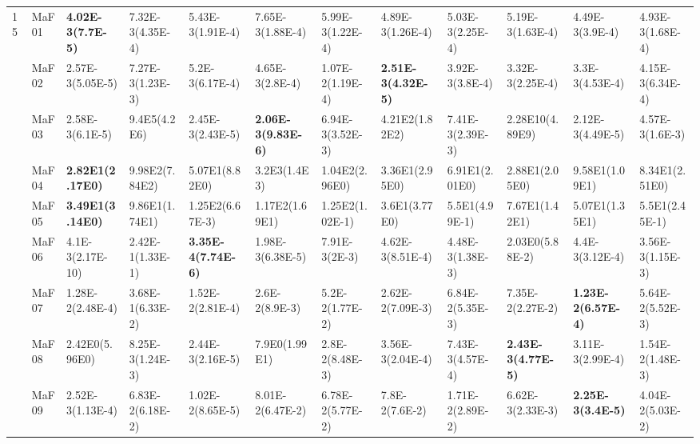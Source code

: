 \documentclass[]{article}
\begin{document}
\begin{landscape}
\begin{table}
\begin{footnotesize}
\begin{tabular}{|l|l|l|l|l|l|l|l|l|l|l|l|}
\multirow{15}{*}{15} & MaF01 & \cellcolor{gray95} {\bf 4.02E-3(7.7E-5)} & 7.32E-3(4.35E-4) & 5.43E-3(1.91E-4) & 7.65E-3(1.88E-4) & 5.99E-3(1.22E-4) & \cellcolor{gray95} 4.89E-3(1.26E-4) & 5.03E-3(2.25E-4) & 5.19E-3(1.63E-4) & \cellcolor{gray95} 4.49E-3(3.9E-4) & \cellcolor{gray95} 4.93E-3(1.68E-4)\\
 & MaF02 & \cellcolor{gray95} 2.57E-3(5.05E-5) & 7.27E-3(1.23E-3) & 5.2E-3(6.17E-4) & 4.65E-3(2.8E-4) & 1.07E-2(1.19E-4) & \cellcolor{gray95} {\bf 2.51E-3(4.32E-5)} & 3.92E-3(3.8E-4) & \cellcolor{gray95} 3.32E-3(2.25E-4) & \cellcolor{gray95} 3.3E-3(4.53E-4) & 4.15E-3(6.34E-4)\\
 & MaF03 & 2.58E-3(6.1E-5) & 9.4E5(4.2E6) & \cellcolor{gray95} 2.45E-3(2.43E-5) & \cellcolor{gray95} {\bf 2.06E-3(9.83E-6)} & 6.94E-3(3.52E-3) & 4.21E2(1.82E2) & 7.41E-3(2.39E-3) & 2.28E10(4.89E9) & \cellcolor{gray95} 2.12E-3(4.49E-5) & 4.57E-3(1.6E-3)\\
 & MaF04 & \cellcolor{gray95} {\bf 2.82E1(2.17E0)} & 9.98E2(7.84E2) & \cellcolor{gray95} 5.07E1(8.82E0) & 3.2E3(1.4E3) & 1.04E2(2.96E0) & \cellcolor{gray95} 3.36E1(2.95E0) & 6.91E1(2.01E0) & \cellcolor{gray95} 2.88E1(2.05E0) & 9.58E1(1.09E1) & 8.34E1(2.51E0)\\
 & MaF05 & \cellcolor{gray95} {\bf 3.49E1(3.14E0)} & 9.86E1(1.74E1) & 1.25E2(6.67E-3) & 1.17E2(1.69E1) & 1.25E2(1.02E-1) & \cellcolor{gray95} 3.6E1(3.77E0) & \cellcolor{gray95} 5.5E1(4.99E-1) & 7.67E1(1.42E1) & \cellcolor{gray95} 5.07E1(1.35E1) & \cellcolor{gray95} 5.5E1(2.45E-1)\\
 & MaF06 & 4.1E-3(2.17E-10) & 2.42E-1(1.33E-1) & \cellcolor{gray95} {\bf 3.35E-4(7.74E-6)} & \cellcolor{gray95} 1.98E-3(6.38E-5) & 7.91E-3(2E-3) & 4.62E-3(8.51E-4) & 4.48E-3(1.38E-3) & 2.03E0(5.88E-2) & 4.4E-3(3.12E-4) & \cellcolor{gray95} 3.56E-3(1.15E-3)\\
 & MaF07 & \cellcolor{gray95} 1.28E-2(2.48E-4) & 3.68E-1(6.33E-2) & \cellcolor{gray95} 1.52E-2(2.81E-4) & 2.6E-2(8.9E-3) & 5.2E-2(1.77E-2) & 2.62E-2(7.09E-3) & 6.84E-2(5.35E-3) & 7.35E-2(2.27E-2) & \cellcolor{gray95} {\bf 1.23E-2(6.57E-4)} & 5.64E-2(5.52E-3)\\
 & MaF08 & \cellcolor{gray95} 2.42E0(5.96E0) & 8.25E-3(1.24E-3) & \cellcolor{gray95} 2.44E-3(2.16E-5) & 7.9E0(1.99E1) & 2.8E-2(8.48E-3) & \cellcolor{gray95} 3.56E-3(2.04E-4) & 7.43E-3(4.57E-4) & \cellcolor{gray95} {\bf 2.43E-3(4.77E-5)} & \cellcolor{gray95} 3.11E-3(2.99E-4) & 1.54E-2(1.48E-3)\\
 & MaF09 & \cellcolor{gray95} 2.52E-3(1.13E-4) & 6.83E-2(6.18E-2) & 1.02E-2(8.65E-5) & 8.01E-2(6.47E-2) & 6.78E-2(5.77E-2) & 7.8E-2(7.6E-2) & 1.71E-2(2.89E-2) & \cellcolor{gray95} 6.62E-3(2.33E-3) & \cellcolor{gray95} {\bf 2.25E-3(3.4E-5)} & 4.04E-2(5.03E-2)\\

\end{tabular}
\end{footnotesize}
\end{table}
\end{landscape}
\end{document}
